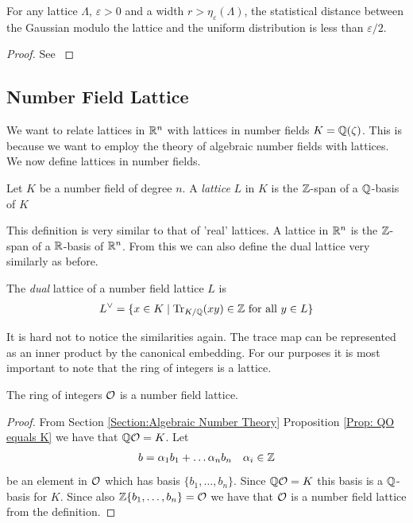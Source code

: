     \begin{proposition}
        For any lattice \(\Lambda\), \(\varepsilon > 0\) and a width \(r > \eta_\varepsilon(\Lambda)\), the statistical distance between the Gaussian modulo the lattice and the uniform distribution is less than \(\varepsilon / 2\).
    \end{proposition}
    \begin{proof}
        See \cite[Lemma 4.1]{Smoothing Parameter Proof}
    \end{proof}
    
\subsection{Number Field Lattice}
    We want to relate lattices in \(\mathbb{R}^n\) with lattices in number fields \(K = \mathbb{Q}(\zeta)\). This is because we want to employ the theory of algebraic number fields with lattices. We now define lattices in number fields.
    \begin{definition}
        Let \(K\) be a number field of degree \(n\). A \emph{lattice} \(L\)  in \(K\) is the \(\mathbb{Z}\)-span of a \(\mathbb{Q}\)-basis of \(K\) 
    \end{definition}
    This definition is very similar to that of 'real' lattices. A lattice in \(\mathbb{R}^n\) is the \(\mathbb{Z}\)-span of a \(\mathbb{R}\)-basis of \(\mathbb{R}^n\). From this we can also define the dual lattice very similarly as before.
    \begin{definition}
        The \emph{dual} lattice of a number field lattice \(L\) is
        \begin{align*}
            L^\vee = \{x\in K\;|\; \mathrm{Tr}_{K/\mathbb{Q}}(xy)\in\mathbb{Z}\text{ for all } y\in L\}
        \end{align*}
    \end{definition}
    It is hard not to notice the similarities again. The trace map can be represented as an inner product by the canonical embedding. For our purposes it is most important to note that the ring of integers is a lattice.
    \begin{proposition}
        The ring of integers \(\mathcal{O}\) is a number field lattice.
    \end{proposition}
    \begin{proof}
        From Section \ref{Section:Algebraic Number Theory} Proposition \ref{Prop: QO equals K} we have that \(\mathbb{Q}\mathcal{O} = K\). Let
        \begin{align*}
            b = \alpha_1b_1 + \dots \alpha_n b_n\quad \alpha_i\in\mathbb{Z}
        \end{align*}
         be an element in \(\mathcal{O}\) which has basis \(\{b_1,\dots ,b_n\}\). Since \(\mathbb{Q}\mathcal{O} = K\) this basis is a \(\mathbb{Q}\)-basis for \(K\). Since also \(\mathbb{Z}\{b_1, \dots ,b_n\} = \mathcal{O}\) we have that \(\mathcal{O}\) is a number field lattice from the definition.
    \end{proof}
